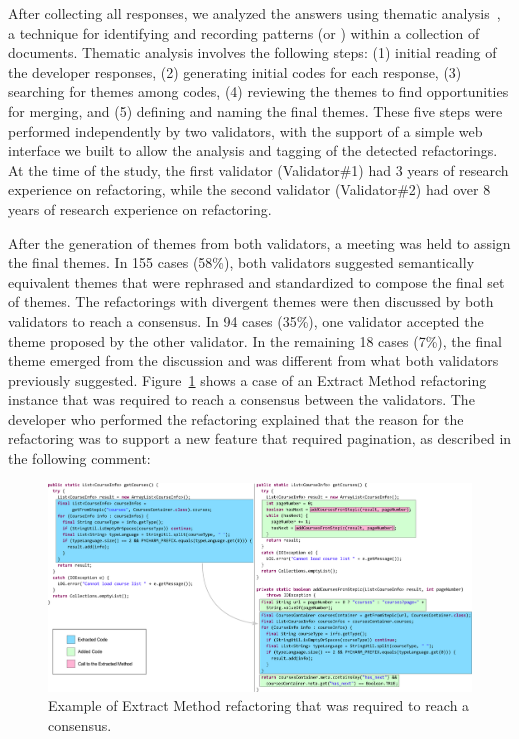 After collecting all responses, we analyzed the answers using thematic analysis~\citep{Cruzes:2011}, a technique for identifying and recording patterns (or ) within a collection of documents.
Thematic analysis involves the following steps: (1) initial reading of the developer responses, (2) generating initial codes for each response, (3) searching for themes among codes, (4) reviewing the themes to find opportunities for merging, and (5) defining and naming the final themes.
These five steps were performed independently by two validators,  with the support of a simple web interface we built to allow the analysis and tagging of the detected refactorings.
At the time of the study, the first validator (Validator\#1) had 3 years of research experience on refactoring, while the second validator (Validator\#2) had over 8 years of research experience on refactoring.

After the generation of themes from both validators, a meeting was held to assign the final themes. In 155 cases (58\%), both validators suggested semantically equivalent themes that were rephrased and standardized to compose the final set of themes. The refactorings with divergent themes were then discussed by both validators to reach a consensus. In 94 cases (35\%), one validator accepted the theme proposed by the other validator. In the remaining 18 cases (7\%), the final theme emerged from the discussion and was different from what both validators previously suggested.
Figure~\ref{fig:consenus_example} shows a case of an {\textsc Extract Method} refactoring instance that was required to reach a consensus between the validators. The developer who performed the refactoring explained that the reason for the refactoring was to support a new feature that required pagination, as described in the following comment:\margin

\margin

\begin{figure}[htbp]
	\centering
	\includegraphics[width=0.9\linewidth]{img/code-sample.pdf}
	\caption{Example of Extract Method refactoring that was required to reach a consensus.}
	\label{fig:consenus_example}
\end{figure}

